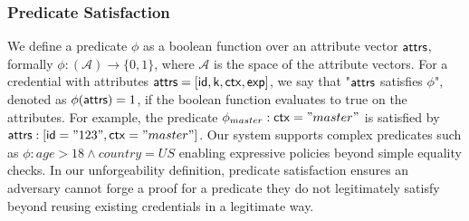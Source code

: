\subsubsection*{Predicate Satisfaction}
We define a predicate $\phi$ as a boolean function over an attribute vector $\mathsf{attrs}$, formally  $\phi: (\mathcal{A}) \rightarrow \{0,1\}$, where $\mathcal{A}$ is the space of the attribute vectors. 
For a credential with attributes $\mathsf{attrs} = [\mathsf{id}, \mathsf{k}, \mathsf{ctx}, \mathsf{exp}]$, we say that "$\mathsf{attrs}$ satisfies $\phi$", denoted as $\phi(\mathsf{attrs}) = 1$, if the boolean function evaluates to true on the attributes.
For example, the predicate $\phi_{master}:\mathsf{ctx} = "master"$ is satisfied by $\mathsf{attrs}: [\mathsf{id}="123", \mathsf{ctx}="master"]$. Our system supports complex predicates such as $\phi: age > 18 \wedge country = US$ enabling expressive policies beyond simple equality checks. In our unforgeability definition, predicate satisfaction ensures an adversary cannot forge a proof for a predicate they do not legitimately satisfy beyond reusing existing credentials in a legitimate way.

